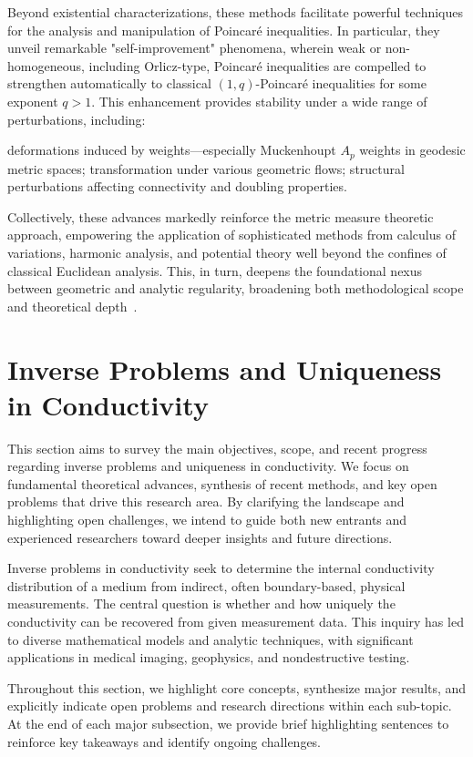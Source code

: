 \documentclass[sigconf]{acmart}
\begin{document}
Beyond existential characterizations, these methods facilitate powerful techniques for the analysis and manipulation of Poincaré inequalities. In particular, they unveil remarkable "self-improvement" phenomena, wherein weak or non-homogeneous, including Orlicz-type, Poincaré inequalities are compelled to strengthen automatically to classical $(1, q)$-Poincaré inequalities for some exponent $q > 1$. This enhancement provides stability under a wide range of perturbations, including:

deformations induced by weights—especially Muckenhoupt $A_p$ weights in geodesic metric spaces;
transformation under various geometric flows;
structural perturbations affecting connectivity and doubling properties.

Collectively, these advances markedly reinforce the metric measure theoretic approach, empowering the application of sophisticated methods from calculus of variations, harmonic analysis, and potential theory well beyond the confines of classical Euclidean analysis. This, in turn, deepens the foundational nexus between geometric and analytic regularity, broadening both methodological scope and theoretical depth~\cite{ref93}.

\section{Inverse Problems and Uniqueness in Conductivity}

This section aims to survey the main objectives, scope, and recent progress regarding inverse problems and uniqueness in conductivity. We focus on fundamental theoretical advances, synthesis of recent methods, and key open problems that drive this research area. By clarifying the landscape and highlighting open challenges, we intend to guide both new entrants and experienced researchers toward deeper insights and future directions.

Inverse problems in conductivity seek to determine the internal conductivity distribution of a medium from indirect, often boundary-based, physical measurements. The central question is whether and how uniquely the conductivity can be recovered from given measurement data. This inquiry has led to diverse mathematical models and analytic techniques, with significant applications in medical imaging, geophysics, and nondestructive testing.

Throughout this section, we highlight core concepts, synthesize major results, and explicitly indicate open problems and research directions within each sub-topic. At the end of each major subsection, we provide brief highlighting sentences to reinforce key takeaways and identify ongoing challenges.
\end{document}
